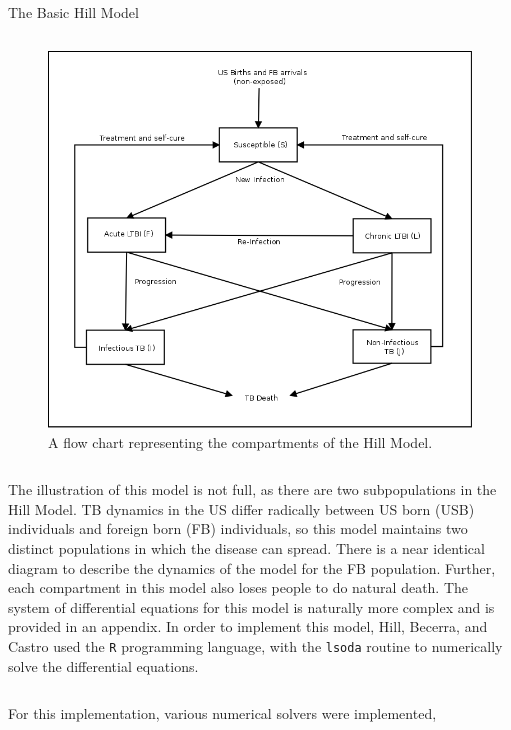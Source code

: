 \documentclass[final]{beamer}
\begin{document}
\begin{frame}
\begin{columns}
\begin{column}{.3\textwidth}
\begin{block}{The Basic Hill Model}
\begin{block}{}
\begin{column}{.2\textwidth}
\begin{figure}[h]
\begin{center}
                \includegraphics[scale=.25]{HillModelFlowChart}
              \end{center}
              \caption{A flow chart representing the compartments of the Hill
                       Model.}
              \label{fig:hillFlow}
            \end{figure}
          \end{column}
          \begin{column}{.6\textwidth}
            The illustration of this model is not full, as there are two
            subpopulations in the Hill Model. TB dynamics in the US differ
            radically between US born (USB) individuals and foreign born (FB)
            individuals,  so this model maintains two distinct populations in
            which the disease can spread. There is a near identical diagram to
            describe the dynamics of the model for the FB population. Further,
            each compartment in this model also loses people to do natural
            death. The system of differential equations for this model is
            naturally more complex and is provided in an appendix. In order to
            implement this model, Hill, Becerra, and Castro used the \texttt{R}
            programming language, with the \texttt{lsoda} routine to numerically
            solve the differential equations. 
          \end{column}
        \end{block}
        For this implementation, various numerical solvers were implemented,

\end{block}
\end{column}
\end{columns}
\end{frame}
\end{document}
